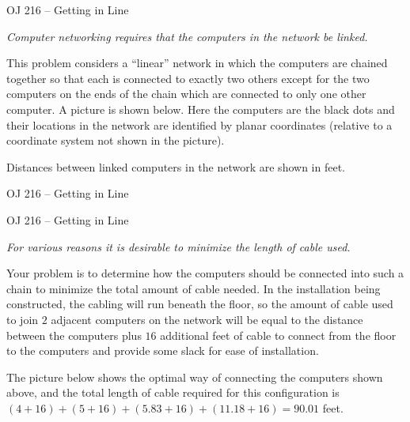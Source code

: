 \begin{frame}[fragile]{OJ 216 -- Getting in Line}

{\it Computer networking requires that the computers in the network be linked.

This problem considers a ``linear'' network in which the computers are chained together so that each
is connected to exactly two others except for the two computers on the ends of the chain which are
connected to only one other computer. A picture is shown below. Here the computers are the black
dots and their locations in the network are identified by planar coordinates (relative to a coordinate
system not shown in the picture).

Distances between linked computers in the network are shown in feet.}
\end{frame}


\begin{frame}[fragile]{OJ 216 -- Getting in Line}
\begin{figure}[h]
    \centering

\end{figure}

\end{frame}

\begin{frame}[fragile]{OJ 216 -- Getting in Line}

{\it For various reasons it is desirable to minimize the length of cable used.

Your problem is to determine how the computers should be connected into such a chain to minimize
the total amount of cable needed. In the installation being constructed, the cabling will run beneath
the floor, so the amount of cable used to join $2$ adjacent computers on the network will be equal to
the distance between the computers plus $16$ additional feet of cable to connect from the floor to the
computers and provide some slack for ease of installation.

The picture below shows the optimal way of connecting the computers shown above, and the total
length of cable required for this configuration is $(4+16)+ (5+16) + (5.83+16) + (11.18+16) = 90.01$
feet.}

\end{frame}

